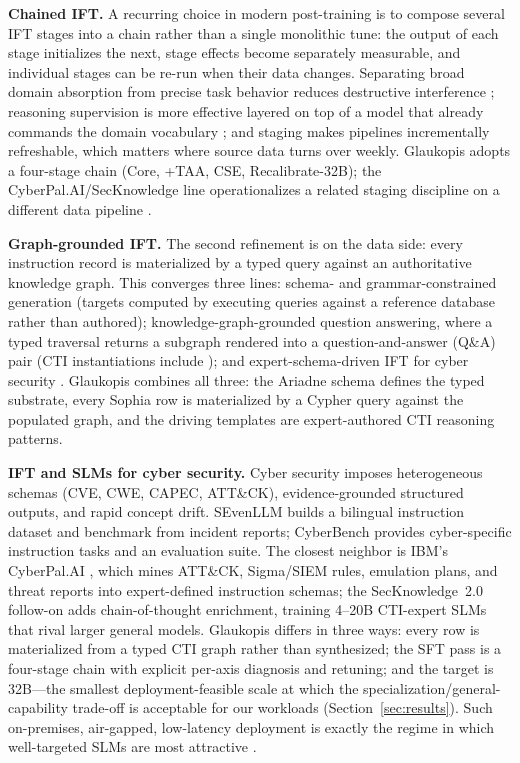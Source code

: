 \documentclass[conference]{IEEEtran}
\begin{document}
\textbf{Chained IFT.} A recurring choice in modern post-training is to compose several IFT stages into a chain rather than a single monolithic tune: the output of each stage initializes the next, stage effects become separately measurable, and individual stages can be re-run when their data changes. Separating broad domain absorption from precise task behavior reduces destructive interference \cite{gururangan2020dontstop,ouyang2022instructgpt}; reasoning supervision is more effective layered on top of a model that already commands the domain vocabulary \cite{wei2022cot,levi2025toward}; and staging makes pipelines incrementally refreshable, which matters where source data turns over weekly. Glaukopis adopts a four-stage chain (Core, +TAA, CSE, Recalibrate-32B); the CyberPal.AI/SecKnowledge line operationalizes a related staging discipline on a different data pipeline \cite{levi2024cyberpal,levi2025toward}.

\textbf{Graph-grounded IFT.} The second refinement is on the data side: every instruction record is materialized by a typed query against an authoritative knowledge graph. This converges three lines: schema- and grammar-constrained generation (targets computed by executing queries against a reference database rather than authored); knowledge-graph-grounded question answering, where a typed traversal returns a subgraph rendered into a question-and-answer (Q\&A) pair (CTI instantiations include \cite{fieblinger2024kg,wu2022opencykg,yu2024ctikg,zhao2024kctiaa,zhang2023cyberkg}); and expert-schema-driven IFT for cyber security \cite{levi2024cyberpal,levi2025toward}. Glaukopis combines all three: the Ariadne schema defines the typed substrate, every Sophia row is materialized by a Cypher query against the populated graph, and the driving templates are expert-authored CTI reasoning patterns.

\textbf{IFT and SLMs for cyber security.} Cyber security imposes heterogeneous schemas (CVE, CWE, CAPEC, ATT\&CK), evidence-grounded structured outputs, and rapid concept drift. SEvenLLM \cite{ji2024sevenllm} builds a bilingual instruction dataset and benchmark from incident reports; CyberBench \cite{liu2024cyberbench} provides cyber-specific instruction tasks and an evaluation suite. The closest neighbor is IBM's CyberPal.AI \cite{levi2024cyberpal}, which mines ATT\&CK, Sigma/SIEM rules, emulation plans, and threat reports into expert-defined instruction schemas; the SecKnowledge~2.0 follow-on \cite{levi2025toward} adds chain-of-thought enrichment, training 4--20B CTI-expert SLMs that rival larger general models. Glaukopis differs in three ways: every row is materialized from a typed CTI graph rather than synthesized; the SFT pass is a four-stage chain with explicit per-axis diagnosis and retuning; and the target is 32B---the smallest deployment-feasible scale at which the specialization/general-capability trade-off is acceptable for our workloads (Section~\ref{sec:results}). Such on-premises, air-gapped, low-latency deployment is exactly the regime in which well-targeted SLMs are most attractive \cite{levi2025toward}.
\end{document}

